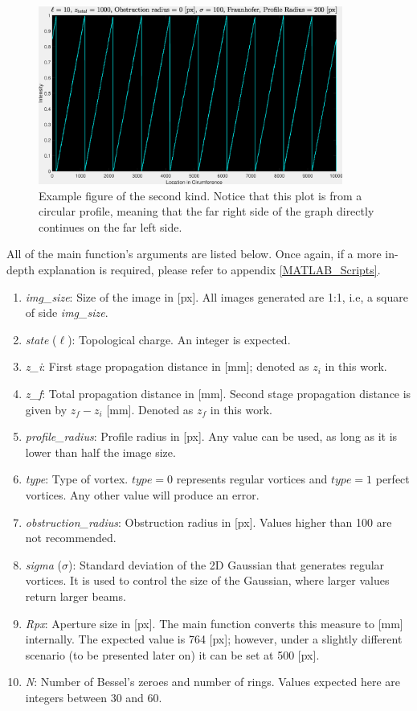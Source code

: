 \begin{figure}[htbp]
    \centering
    \includegraphics[width=10cm]{images/c03/TC_example.eps}
    \caption{Example figure of the second kind. Notice that this plot is from a circular profile, meaning that the far right side of the graph directly continues on the far left side.}
    \label{fig:example_figure2}
\end{figure}

\newpage
All of the main function's arguments are listed below. Once again, if a more in-depth explanation is required, please refer to appendix \ref{MATLAB_Scripts}.

\begin{enumerate}
    \item \textit{img\_size}: Size of the image in [px]. All images generated are 1:1, i.e, a square of side \textit{img\_size}.
    \item \textit{state} ($\ell$): Topological charge. An integer is expected.
    \item \textit{z\_i}: First stage propagation distance in [mm]; denoted as $z_i$ in this work.
    \item \textit{z\_f}: Total propagation distance in [mm]. Second stage propagation distance is given by $z_f - z_i$ [mm]. Denoted as $z_f$ in this work.
    \item \textit{profile\_radius}: Profile radius in [px]. Any value can be used, as long as it is lower than half the image size.
    \item \textit{type}: Type of vortex. $type = 0$ represents regular vortices and $type = 1$ perfect vortices. Any other value will produce an error.
    \item \textit{obstruction\_radius}: Obstruction radius in [px]. Values higher than 100 are not recommended.
    \item \textit{sigma} ($\sigma$): Standard deviation of the 2D Gaussian that generates regular vortices. It is used to control the size of the Gaussian, where larger values return larger beams.
    \item \textit{Rpx}: Aperture size in [px]. The main function converts this measure to [mm] internally. The expected value is 764 [px]; however, under a slightly different scenario (to be presented later on) it can be set at 500 [px].
    \item \textit{N}: Number of Bessel's zeroes and number of rings. Values expected here are integers between 30 and 60.
\end{enumerate}

